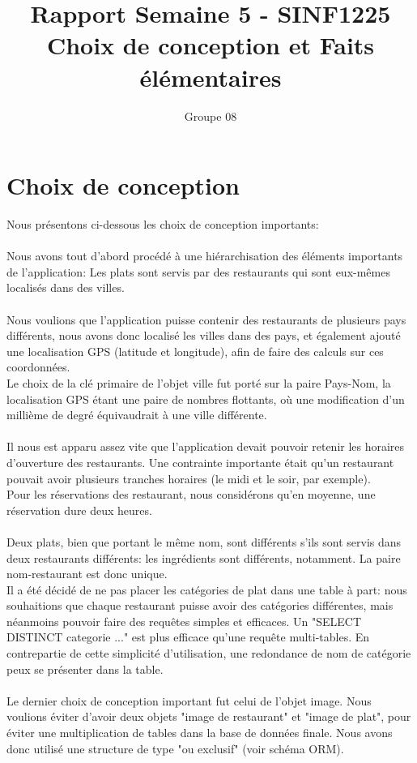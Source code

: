 \documentclass[10pt,a4paper]{article}
\title{Rapport Semaine 5 - SINF1225\\Choix de conception et Faits élémentaires}
\author{Groupe 08}
\begin{document}
\maketitle
\section{Choix de conception}
Nous présentons ci-dessous les choix de conception importants:\\
\\
Nous avons tout d'abord procédé à une hiérarchisation des éléments importants de l'application: Les plats sont servis par des restaurants qui sont eux-mêmes localisés dans des villes.\\
\\
Nous voulions que l'application puisse contenir des restaurants de plusieurs pays différents, nous avons donc localisé les villes dans des pays, et également ajouté une localisation GPS (latitude et longitude), afin de faire des calculs sur ces coordonnées.\\
Le choix de la clé primaire de l'objet ville fut porté sur la paire Pays-Nom, la localisation GPS étant une paire de nombres flottants, où une modification d'un millième de degré équivaudrait à une ville différente.\\
\\
Il nous est apparu assez vite que l'application devait pouvoir retenir les horaires d'ouverture des restaurants. Une contrainte importante était qu'un restaurant pouvait avoir plusieurs tranches horaires (le midi et le soir, par exemple).\\
Pour les réservations des restaurant, nous considérons qu'en moyenne, une réservation dure deux heures.\\
\\
Deux plats, bien que portant le même nom, sont différents s'ils sont servis dans deux restaurants différents: les ingrédients sont différents, notamment. La paire nom-restaurant est donc unique.\\
Il a été décidé de ne pas placer les catégories de plat dans une table à part: nous souhaitions que chaque restaurant puisse avoir des catégories différentes, mais néanmoins pouvoir faire des requêtes simples et efficaces. Un "SELECT DISTINCT categorie ..." est plus efficace qu'une requête multi-tables. En contrepartie de cette simplicité d'utilisation, une redondance de nom de catégorie peux se présenter dans la table.\\
\\
Le dernier choix de conception important fut celui de l'objet image. Nous voulions éviter d'avoir deux objets "image de restaurant" et "image de plat", pour éviter une multiplication de tables dans la base de données finale. Nous avons donc utilisé une structure de type "ou exclusif" (voir schéma ORM).
\newpage
\end{document}
